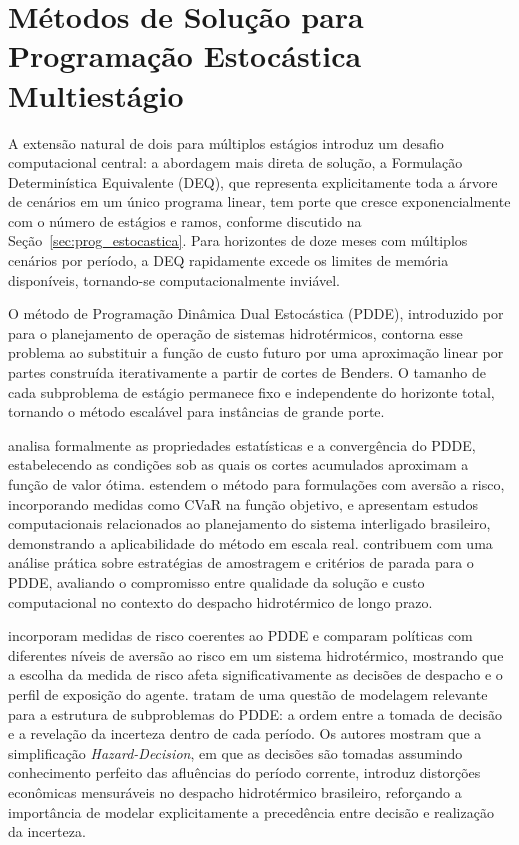 \section{Métodos de Solução para Programação Estocástica Multiestágio}
\label{sec:rl_sddp}

A extensão natural de dois para múltiplos estágios introduz um desafio computacional central: a abordagem mais direta de solução, a Formulação Determinística Equivalente (DEQ), que representa explicitamente toda a árvore de cenários em um único programa linear, tem porte que cresce exponencialmente com o número de estágios e ramos, conforme discutido na Seção~\ref{sec:prog_estocastica}. Para horizontes de doze meses com múltiplos cenários por período, a DEQ rapidamente excede os limites de memória disponíveis, tornando-se computacionalmente inviável.

O método de Programação Dinâmica Dual Estocástica (PDDE), introduzido por  para o planejamento de operação de sistemas hidrotérmicos, contorna esse problema ao substituir a função de custo futuro por uma aproximação linear por partes construída iterativamente a partir de cortes de Benders. O tamanho de cada subproblema de estágio permanece fixo e independente do horizonte total, tornando o método escalável para instâncias de grande porte.

\cite{shapiro2011} analisa formalmente as propriedades estatísticas e a convergência do PDDE, estabelecendo as condições sob as quais os cortes acumulados aproximam a função de valor ótima. \cite{shapiro2013} estendem o método para formulações com aversão a risco, incorporando medidas como CVaR na função objetivo, e apresentam estudos computacionais relacionados ao planejamento do sistema interligado brasileiro, demonstrando a aplicabilidade do método em escala real. \cite{homemdemello2011} contribuem com uma análise prática sobre estratégias de amostragem e critérios de parada para o PDDE, avaliando o compromisso entre qualidade da solução e custo computacional no contexto do despacho hidrotérmico de longo prazo.

\cite{philpott2012} incorporam medidas de risco coerentes ao PDDE e comparam políticas com diferentes níveis de aversão ao risco em um sistema hidrotérmico, mostrando que a escolha da medida de risco afeta significativamente as decisões de despacho e o perfil de exposição do agente. \cite{street2020} tratam de uma questão de modelagem relevante para a estrutura de subproblemas do PDDE: a ordem entre a tomada de decisão e a revelação da incerteza dentro de cada período. Os autores mostram que a simplificação \emph{Hazard-Decision}, em que as decisões são tomadas assumindo conhecimento perfeito das afluências do período corrente, introduz distorções econômicas mensuráveis no despacho hidrotérmico brasileiro, reforçando a importância de modelar explicitamente a precedência entre decisão e realização da incerteza.

